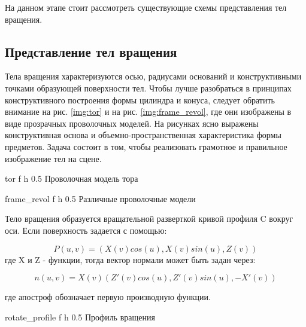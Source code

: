 На данном этапе стоит рассмотреть существующие схемы представления тел вращения.

\subsection{Представление тел вращения}

Тела вращения характеризуются осью, радиусами оснований и конструктивными точками образующей поверхности тел.
Чтобы лучше разобраться в принципах конструктивного построения формы цилиндра и конуса,
следует обратить внимание на рис. \ref{img:tor} и на рис. \ref{img:frame_revol}, где они изображены в виде прозрачных проволочных моделей.
На рисунках ясно выражены конструктивная основа и объемно-пространственная характеристика формы предметов.
Задача состоит в том, чтобы реализовать грамотное и правильное изображение тел на сцене.

{tor} %
{f} %
{h} %
{0.5\textwidth} %
{Проволочная модель тора} %

{frame_revol} %
{f} %
{h} %
{0.5\textwidth} %
{Различные проволочные модели} %

Тело вращения образуется вращательной разверткой кривой профиля C вокруг оси. Если поверхность задается с помощью:\newline

\begin{equation}
P(u, v) = (X(v)cos(u), X(v)sin(u), Z(v))
\end{equation}
где X и Z - функции, тогда вектор нормали может быть задан через:\newline

\begin{equation}
n(u, v) = X(v) (Z' (v)cos(u), Z' (v)sin(u), - X' (v))
\end{equation}

где апостроф обозначает первую производную функции.

{rotate_profile} %
{f} %
{h} %
{0.5\textwidth} %
{Профиль вращения} %


